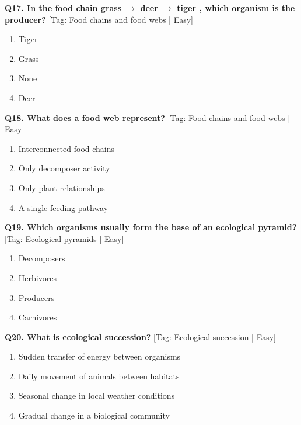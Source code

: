 \noindent\textbf{Q17. In the food chain grass $\to$ deer $\to$ tiger , which organism is the producer?} \hfill [Tag: Food chains and food webs | Easy]
\begin{enumerate}[label=(\alph*),topsep=2pt,itemsep=1pt,partopsep=0pt,parsep=0pt]
    \item {Tiger}
    \item {Grass}
    \item {None}
    \item {Deer}
\end{enumerate}
\vspace{2mm}

\noindent\textbf{Q18. What does a food web represent?} \hfill [Tag: Food chains and food webs | Easy]
\begin{enumerate}[label=(\alph*),topsep=2pt,itemsep=1pt,partopsep=0pt,parsep=0pt]
    \item {Interconnected food chains}
    \item {Only decomposer activity}
    \item {Only plant relationships}
    \item {A single feeding pathway}
\end{enumerate}
\vspace{2mm}

\noindent\textbf{Q19. Which organisms usually form the base of an ecological pyramid?} \hfill [Tag: Ecological pyramids | Easy]
\begin{enumerate}[label=(\alph*),topsep=2pt,itemsep=1pt,partopsep=0pt,parsep=0pt]
    \item {Decomposers}
    \item {Herbivores}
    \item {Producers}
    \item {Carnivores}
\end{enumerate}
\vspace{2mm}

\noindent\textbf{Q20. What is ecological succession?} \hfill [Tag: Ecological succession | Easy]
\begin{enumerate}[label=(\alph*),topsep=2pt,itemsep=1pt,partopsep=0pt,parsep=0pt]
    \item {Sudden transfer of energy between organisms}
    \item {Daily movement of animals between habitats}
    \item {Seasonal change in local weather conditions}
    \item {Gradual change in a biological community}
\end{enumerate}
\vspace{2mm}

